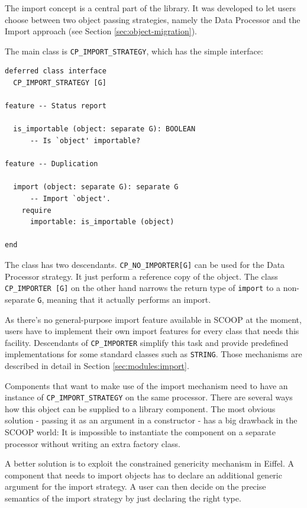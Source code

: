 \documentclass[a4paper,10pt]{article}
\begin{document}
The import concept is a central part of the library.
It was developed to let users choose between two object passing strategies, namely the Data Processor and the Import approach (see Section \ref{sec:object-migration}).

The main class is \lstinline!CP_IMPORT_STRATEGY!, which has the simple interface:

\begin{lstlisting}[language=OOSC2Eiffel, captionpos=b, caption={The deferred class CP\_IMPORT\_STRATEGY.}]
deferred class interface
  CP_IMPORT_STRATEGY [G]

feature -- Status report

  is_importable (object: separate G): BOOLEAN
      -- Is `object' importable?

feature -- Duplication

  import (object: separate G): separate G
      -- Import `object'.
    require
      importable: is_importable (object)

end
\end{lstlisting}


The class has two descendants.
\lstinline!CP_NO_IMPORTER[G]! can be used for the Data Processor strategy. 
It just perform a reference copy of the object.
The class \lstinline!CP_IMPORTER [G]! on the other hand narrows the return type of \lstinline!import! to a non-separate \lstinline!G!, meaning that it actually performs an import.

As there's no general-purpose import feature available in SCOOP at the moment, users have to implement their own import features for every class that needs this facility.
Descendants of \lstinline!CP_IMPORTER! simplify this task and provide predefined implementations for some standard classes such as \lstinline!STRING!.
Those mechanisms are described in detail in Section \ref{sec:modules:import}.

Components that want to make use of the import mechanism need to have an instance of \lstinline!CP_IMPORT_STRATEGY! on the same processor.
There are several ways how this object can be supplied to a library component.
The most obvious solution - passing it as an argument in a constructor - has a big drawback in the SCOOP world:
It is impossible to instantiate the component on a separate processor without writing an extra factory class.

A better solution is to exploit the constrained genericity mechanism in Eiffel.
A component that needs to import objects has to declare an additional generic argument for the import strategy.
A user can then decide on the precise semantics of the import strategy by just declaring the right type.
\end{document}
